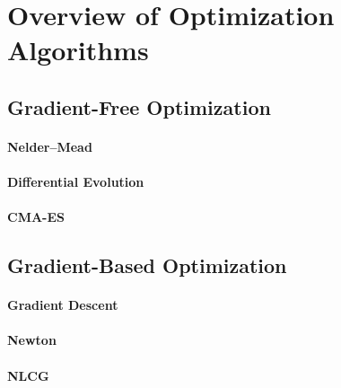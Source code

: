 \section{Overview of Optimization Algorithms}

\blindtext{}

\subsection{Gradient-Free Optimization}

\blindtext{}

\paragraph{Nelder--Mead}

\blindtext{}

\paragraph{Differential Evolution}

\blindtext{}

\paragraph{CMA-ES}

\blindtext{}

\subsection{Gradient-Based Optimization}

\blindtext{}

\paragraph{Gradient Descent}

\blindtext{}

\paragraph{Newton}

\blindtext{}

\paragraph{NLCG}

\blindtext{}
